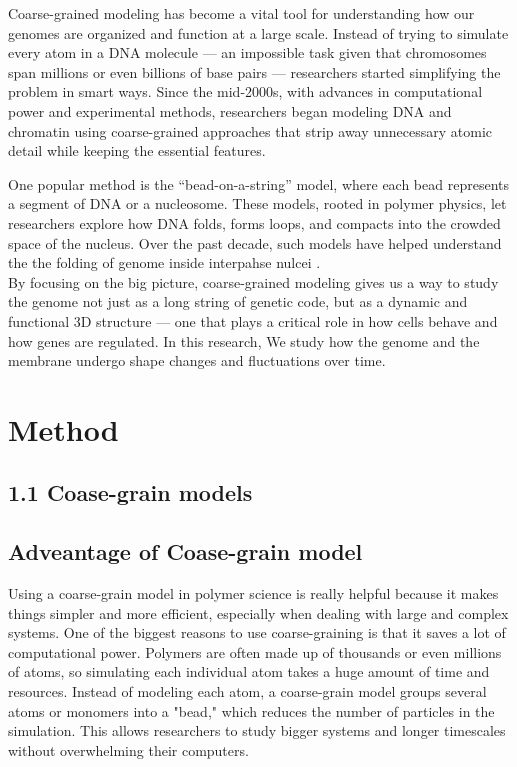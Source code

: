 \documentclass[12pt]{article}
\begin{document}
\begin{flushleft}
Coarse-grained modeling has become a vital tool for understanding how our genomes are organized and function at a large scale. Instead of trying to simulate every atom in a DNA molecule — an impossible task given that chromosomes span millions or even billions of base pairs — researchers started simplifying the problem in smart ways. Since the mid-2000s, with advances in computational power and experimental methods, researchers began modeling DNA and chromatin using coarse-grained approaches that strip away unnecessary atomic detail while keeping the essential features.

One popular method is the “bead-on-a-string” model, where each bead represents a segment of DNA or a nucleosome. These models, rooted in polymer physics, let researchers explore how DNA folds, forms loops, and compacts into the crowded space of the nucleus. Over the past decade, such models have helped understand the the folding of genome inside interpahse nulcei \cite{Lizana2024}.\\




By focusing on the big picture, coarse-grained modeling gives us a way to study the genome not just as a long string of genetic code, but as a dynamic and functional 3D structure — one that plays a critical role in how cells behave and how genes are regulated. In this research, We study how the genome and the membrane undergo shape changes and fluctuations over time.



\section*{Method} 

\subsection*{1.1 Coase-grain models}

\subsection*{Adveantage of Coase-grain model}



	Using a coarse-grain model in polymer science is really helpful because it makes things simpler and more efficient, especially when dealing with large and complex systems. One of the biggest reasons to use coarse-graining is that it saves a lot of computational power. Polymers are often made up of thousands or even millions of atoms, so simulating each individual atom takes a huge amount of time and resources. Instead of modeling each atom, a coarse-grain model groups several atoms or monomers into a "bead," which reduces the number of particles in the simulation. This allows researchers to study bigger systems and longer timescales without overwhelming their computers.


\end{flushleft}
\end{document}
